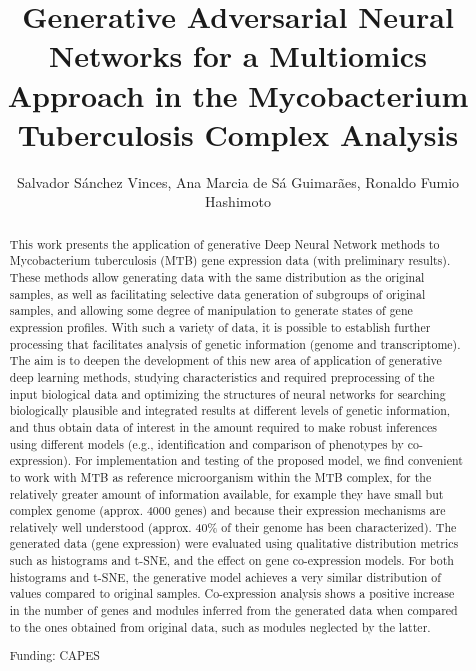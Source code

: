 \documentclass[twoside]{article}
\title{\vspace{-15mm}\fontsize{24pt}{10pt}\selectfont\textbf{ Generative Adversarial Neural Networks for a Multiomics Approach in the Mycobacterium Tuberculosis Complex Analysis }} %
\author{ Salvador S\'anchez Vinces, Ana Marcia de S\'a Guimar\~aes, Ronaldo Fumio Hashimoto }
\affil{ University of S\~ao Paulo }
\date{}
\begin{document}
  
  
  \maketitle %
  
  
  \thispagestyle{fancy} %
  
  
  \begin{abstract}
  This work presents the application of generative Deep Neural Network methods to Mycobacterium tuberculosis (MTB) gene expression data (with preliminary results). These methods allow generating data with the same distribution as the original samples,  as well as facilitating selective data generation of subgroups of original samples,  and allowing some degree of manipulation to generate states of gene expression profiles. With such a variety of data,  it is possible to establish further processing that facilitates analysis of genetic information (genome and transcriptome). The aim is to deepen the development of this new area of application of generative deep learning methods,  studying characteristics and required preprocessing of the input biological data and optimizing the structures of neural networks for searching biologically plausible and integrated results at different levels of genetic information,  and thus obtain data of interest in the amount required to make robust inferences using different models (e.g.,  identification and comparison of phenotypes by co-expression). For implementation and testing of the proposed model,  we find convenient to work with MTB as reference microorganism within the MTB complex,  for the relatively greater amount of information available,  for example they have small but complex genome (approx. 4000 genes) and because their expression mechanisms are relatively well understood (approx. 40\% of their genome has been characterized).
The generated data (gene expression) were evaluated using qualitative distribution metrics such as histograms and t-SNE,  and the effect on gene co-expression models. For both histograms and t-SNE,  the generative model achieves a very similar distribution of values compared to original samples. Co-expression analysis shows a positive increase in the number of genes and modules inferred from the generated data when compared to the ones obtained from original data,  such as modules neglected by the latter.
  
  Funding: CAPES \\ 
  \end{abstract}
  
\end{document}
